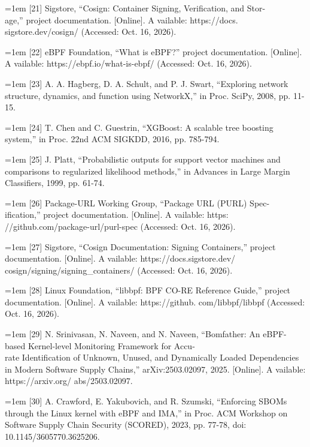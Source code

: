 \documentclass[conference]{IEEEtran}
\begin{document}
\par\noindent\hangindent=1em {[}21{]} Sigstore, ``Cosign: Container Signing, Verification, and Stor-\\age,'' project documentation. {[}Online{]}. A vailable: https://docs. sigstore.dev/cosign/ (Accessed: Oct. 16, 2026).
\par\noindent\hangindent=1em {[}22{]} eBPF Foundation, ``What is eBPF?'' project documentation. {[}Online{]}. A vailable: https://ebpf.io/what-is-ebpf/ (Accessed: Oct. 16, 2026).
\par\noindent\hangindent=1em {[}23{]} A. A. Hagberg, D. A. Schult, and P. J. Swart, ``Exploring network structure, dynamics, and function using NetworkX,'' in Proc. SciPy, 2008, pp. 11-15.
\par\noindent\hangindent=1em {[}24{]} T. Chen and C. Guestrin, ``XGBoost: A scalable tree boosting system,'' in Proc. 22nd ACM SIGKDD, 2016, pp. 785-794.
\par\noindent\hangindent=1em {[}25{]} J. Platt, ``Probabilistic outputs for support vector machines and comparisons to regularized likelihood methods,'' in Advances in Large Margin Classifiers, 1999, pp. 61-74.
\par\noindent\hangindent=1em {[}26{]} Package-URL Working Group, ``Package URL (PURL) Spec- ification,'' project documentation. {[}Online{]}. A vailable: https: //github.com/package-url/purl-spec (Accessed: Oct. 16, 2026).
\par\noindent\hangindent=1em {[}27{]} Sigstore, ``Cosign Documentation: Signing Containers,'' project documentation. {[}Online{]}. A vailable: https://docs.sigstore.dev/ cosign/signing/signing\_containers/ (Accessed: Oct. 16, 2026).
\par\noindent\hangindent=1em {[}28{]} Linux Foundation, ``libbpf: BPF CO-RE Reference Guide,'' project documentation. {[}Online{]}. A vailable: https://github. com/libbpf/libbpf (Accessed: Oct. 16, 2026).
\par\noindent\hangindent=1em {[}29{]} N. Srinivasan, N. Naveen, and N. Naveen, ``Bomfather: An eBPF-based Kernel-level Monitoring Framework for Accu-\\rate Identification of Unknown, Unused, and Dynamically Loaded Dependencies in Modern Software Supply Chains,'' arXiv:2503.02097, 2025. {[}Online{]}. A vailable: https://arxiv.org/ abs/2503.02097.
\par\noindent\hangindent=1em {[}30{]} A. Crawford, E. Yakubovich, and R. Szumski, ``Enforcing SBOMs through the Linux kernel with eBPF and IMA,'' in Proc. ACM Workshop on Software Supply Chain Security (SCORED), 2023, pp. 77-78, doi: 10.1145/3605770.3625206.
\end{document}
